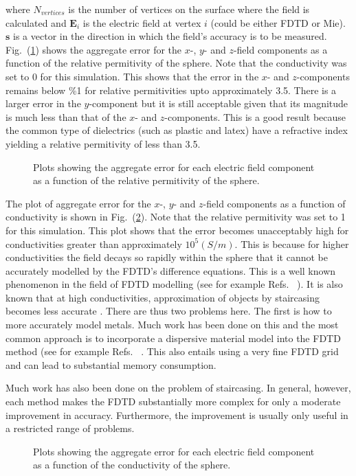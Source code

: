 \documentclass[a4paper, 12pt]{article}
\newcommand{\rfig}[1]{Fig.\ (\ref{#1})}
\newcommand{\refs}{Refs.\ }
\begin{document}
	where $N_{vertices}$ is the number of vertices on the surface where
	the field is calculated and $\mathbf{E}_i$ is the electric field at
	vertex $i$ (could be either FDTD or Mie). $\mathbf{s}$ is a vector in the
	direction in which the field's accuracy is to be
	measured. \rfig{fig:fdtd:relperm} shows the aggregate error for the
	$x$-, $y$- and $z$-field components as a function of the relative
	permitivity of the sphere. Note that the conductivity was set to 0 for
	this simulation. This shows that the error in the $x$- and
	$z$-components remains below \%1 for relative permitivities upto
	approximately 3.5. There is a larger error in the $y$-component but it
	is still acceptable given that its magnitude is much less than that
	of the $x$- and $z$-components. This is a good result because the
	common type of dielectrics (such as plastic and latex) have a
	refractive index yielding a relative permitivity of less than 3.5.
	\begin{figure}[!h]
		\begin{center}
			\caption{Plots showing the aggregate error for each electric field
				component as a function of the relative permitivity of the sphere.}
			\label{fig:fdtd:relperm}
		\end{center}
	\end{figure}
	The plot of aggregate error for the
	$x$-, $y$- and $z$-field components as a function of conductivity is
	shown in \rfig{fig:fdtd:cond}. Note
	that the relative permitivity was set to 1 for this
	simulation. This plot shows that the error becomes unacceptably
	high for conductivities greater than approximately
	$10^5(S/m)$. This is because for higher conductivities the field
	decays so rapidly within the sphere that it cannot be accurately modelled by the
	FDTD's difference equations. This is a well known phenomenon in the
	field of FDTD modelling (see for example \refs
	\cite{penney96ieeetransantprop434,berghe98ieeemicgwlet}). It is
	also known that at high conductivities, approximation of objects by
	staircasing becomes less accurate
	\cite{holland93ieeetranseleccomp434}. There are thus two problems
	here. The first is how to more accurately model metals. Much work
	has been done on this  and the most common approach is to
	incorporate a dispersive material model into the FDTD method (see for example \refs
	\cite{cummer97ieeetransantprop392,judkins95josaa1974}. This
	also entails using a very fine FDTD grid and can lead to
	substantial memory consumption.

	Much work has also been done on the problem of staircasing. In
	general, however, each method makes the FDTD substantially more complex for
	only a moderate improvement in accuracy. Furthermore, the improvement
	is usually only useful in a restricted range of problems.
	\begin{figure}[!h]
		\begin{center}
			\caption{Plots showing the aggregate error for each electric field
				component as a function of the conductivity of the sphere.}
			\label{fig:fdtd:cond}
		\end{center}
	\end{figure}
\end{document}
